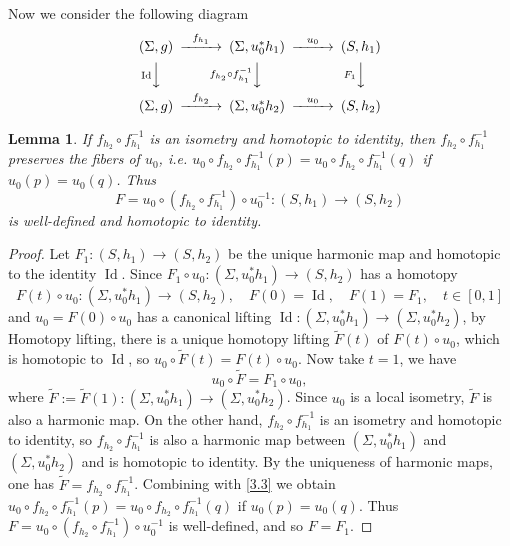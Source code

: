 \documentclass[11pt]{amsart}
\numberwithin{equation}{section}
\theoremstyle{plain}
\newtheorem{lemma}[thm]{Lemma}
\theoremstyle{definition}
\theoremstyle{definition}
\def\op{\operatorname}
\begin{document}
Now we consider the following diagram
\begin{equation*}
\begin{CD}
(\Sigma,g) @>f_{h_1}>> (\Sigma,u^*_0h_1)@>u_0>>(S,h_1)\\
@V\op{Id}VV @Vf_{h_2}\circ f_{h_1}^{-1} VV @V F_1 VV\\
(\Sigma, g) @>f_{h_2}>> (\Sigma,u^*_0h_2)@>u_0>> (S,h_2)
\end{CD} 
\end{equation*}
\begin{lemma}\label{prop11}
If $f_{h_2}\circ f_{h_1}^{-1}$ is an isometry and homotopic to identity, then
$f_{h_2}\circ f_{h_1}^{-1}$ preserves the fibers of $u_0$, i.e. $u_0\circ f_{h_2}\circ f_{h_1}^{-1}(p)=u_0\circ f_{h_2}\circ f_{h_1}^{-1}(q)$  if $u_0(p)=u_0(q)$. Thus $$F=u_0\circ (f_{h_2}\circ f_{h_1}^{-1})\circ u_0^{-1}:(S,h_1)\to (S,h_2)$$	
is well-defined and homotopic to identity.
\end{lemma}
\begin{proof}
Let $F_1:(S,h_1)\to (S,h_2)$ be the unique harmonic map and  homotopic to the identity $\op{Id}$.  Since $F_1\circ u_0:(\Sigma,u^*_0h_1)\to (S,h_2)$ has a homotopy 
$$F(t)\circ u_0:(\Sigma,u^*_0h_1)\to (S,h_2),\quad F(0)=\op{Id},\quad F(1)=F_1,\quad  t\in [0,1]$$
and $u_0=F(0)\circ u_0$ has a canonical lifting $\op{Id}:(\Sigma, u_0^*h_1)\to (\Sigma,u_0^*h_2)$, by Homotopy lifting, there is a unique homotopy lifting $\tilde{F}(t)$ of $F(t)\circ u_0$, which is homotopic to $\op{Id}$, so 
$
u_0\circ\tilde{F}(t)=F(t)\circ u_0.
$
Now take $t=1$, we have 
\begin{equation}\label{3.3}
  u_0\circ\tilde{F}=F_1\circ u_0,
\end{equation}
 where $\tilde{F}:=\tilde{F}(1):(\Sigma, u_0^*h_1)\to (\Sigma,u_0^*h_2)$. Since $u_0$ is a local isometry,  $\tilde{F}$ is also a harmonic map. On the other hand, $f_{h_2}\circ f_{h_1}^{-1}$ is an isometry and homotopic to identity, so $f_{h_2}\circ f_{h_1}^{-1}$ is also a harmonic map between $(\Sigma, u_0^*h_1)$ and $(\Sigma, u_0^*h_2)$ and is homotopic to identity. By the uniqueness of harmonic maps, one has
$\tilde{F}=f_{h_2}\circ f_{h_1}^{-1}$. Combining with \eqref{3.3} we obtain
$u_0\circ f_{h_2}\circ f_{h_1}^{-1}(p)=u_0\circ f_{h_2}\circ f_{h_1}^{-1}(q)$  if $u_0(p)=u_0(q)$. Thus $F=u_0\circ (f_{h_2}\circ f_{h_1}^{-1})\circ u_0^{-1}$
is well-defined, and so $F=F_1$.
\end{proof}
\end{document}
